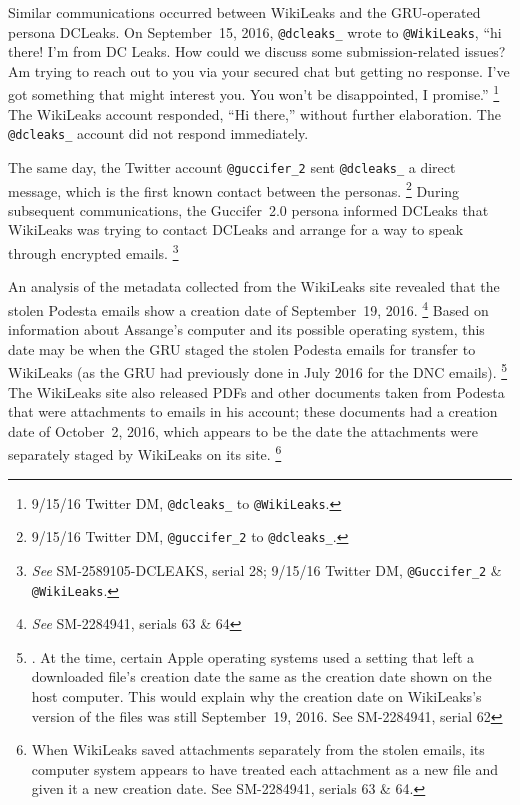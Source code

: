 Similar communications occurred between WikiLeaks and the GRU-operated persona DCLeaks.
On September~15, 2016, \verb+@dcleaks_+ wrote to \verb+@WikiLeaks+, ``hi there!
I'm from DC Leaks.
How could we discuss some submission-related issues?
Am trying to reach out to you via your secured chat but getting no response.
I've got something that might interest you.
You won't be disappointed, I promise.''%
\footnote{9/15/16 Twitter DM, \verb+@dcleaks_+ to \verb+@WikiLeaks+.}
The WikiLeaks account responded, ``Hi there,'' without further elaboration.
The \verb+@dcleaks_+ account did not respond immediately.

The same day, the Twitter account \verb+@guccifer_2+ sent \verb+@dcleaks_+ a direct message, which is the first known contact between the personas.%
\footnote{9/15/16 Twitter DM, \verb+@guccifer_2+ to \verb+@dcleaks_+.}
During subsequent communications, the Guccifer~2.0 persona informed DCLeaks that WikiLeaks was trying to contact DCLeaks and arrange for a way to speak through encrypted emails.%
\footnote{\textit{See} SM-2589105-DCLEAKS, serial 28;
9/15/16 Twitter DM, \verb+@Guccifer_2+ \& \verb+@WikiLeaks+.}

An analysis of the metadata collected from the WikiLeaks site revealed that the stolen Podesta emails show a  creation date of September~19, 2016.%
\footnote{\textit{See} SM-2284941, serials 63 \& 64 }
Based on information about Assange's computer and its possible operating system, this date may be when the GRU staged the stolen Podesta emails for transfer to WikiLeaks (as the GRU had previously done in July 2016 for the DNC emails).%
\footnote{. At the time, certain Apple operating systems used a setting that left a downloaded file's creation date the same as the creation date shown on the host computer.
This would explain why the creation date on WikiLeaks's version of the files was still September~19, 2016.
See SM-2284941, serial 62 }
The WikiLeaks site also released PDFs and other documents taken from Podesta that were attachments to emails in his account; these documents had a creation date of October~2, 2016, which appears to be the date the attachments were separately staged by WikiLeaks on its site.%
\footnote{When WikiLeaks saved attachments separately from the stolen emails, its computer system appears to have treated each attachment as a new file and given it a new creation date.
See SM-2284941, serials 63 \& 64.}

